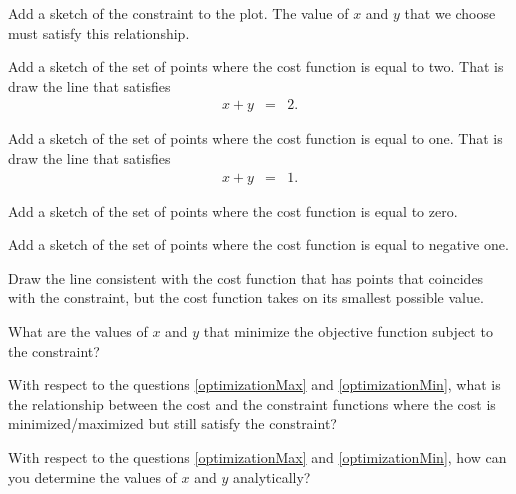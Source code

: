 \begin{problem}
  \begin{subproblem}
    \item Add a sketch of the constraint to the plot. The value of $x$
      and $y$ that we choose must satisfy this relationship.
    \item Add a sketch of the set of points where the cost function is
      equal to two. That is draw the line that satisfies
      \begin{eqnarray*}
        x + y & = & 2.
      \end{eqnarray*}
    \item Add a sketch of the set of points where the cost function is
      equal to one. That is draw the line that satisfies
      \begin{eqnarray*}
        x + y & = & 1.
      \end{eqnarray*}
    \item Add a sketch of the set of points where the cost function is
      equal to zero.
    \item Add a sketch of the set of points where the cost function is
      equal to negative one.
    \item Draw the line consistent with the cost function that
      has points that coincides with the constraint, but the cost
      function takes on its smallest possible value.
    \item What are the values of $x$ and $y$ that minimize the
      objective function subject to the constraint?
  \end{subproblem}

  \clearpage

\item With respect to the questions \ref{optimizationMax} and
  \ref{optimizationMin}, what is the relationship between the
  cost and the constraint functions where the cost is
  minimized/maximized but still satisfy the constraint?

  \vspace{5em}

\item With respect to the questions \ref{optimizationMax} and
  \ref{optimizationMin}, how can you determine the values of $x$ and
  $y$ analytically?

  \vfill


\end{problem}

\postClass

